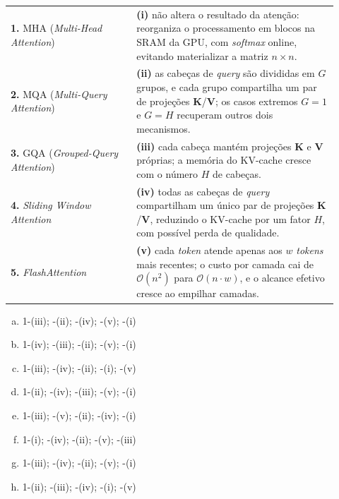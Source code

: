 \documentclass{dlproblemset}
\begin{document}
\begin{enumerate}[I)]
\begin{center}
\begin{tabular}{p{0.35\linewidth} p{0.57\linewidth}}
\textbf{1.} MHA (\textit{Multi-Head Attention}) & \textbf{(i)} não altera o resultado da atenção: reorganiza o processamento em blocos na SRAM da GPU, com \textit{softmax} online, evitando materializar a matriz $n \times n$. \\
\textbf{2.} MQA (\textit{Multi-Query Attention}) & \textbf{(ii)} as cabeças de \textit{query} são divididas em $G$ grupos, e cada grupo compartilha um par de projeções $\mathbf{K}$/$\mathbf{V}$; os casos extremos $G = 1$ e $G = H$ recuperam outros dois mecanismos. \\
\textbf{3.} GQA (\textit{Grouped-Query Attention}) & \textbf{(iii)} cada cabeça mantém projeções $\mathbf{K}$ e $\mathbf{V}$ próprias; a memória do KV-cache cresce com o número $H$ de cabeças. \\
\textbf{4.} \textit{Sliding Window Attention} & \textbf{(iv)} todas as cabeças de \textit{query} compartilham um único par de projeções $\mathbf{K}$/$\mathbf{V}$, reduzindo o KV-cache por um fator $H$, com possível perda de qualidade. \\
\textbf{5.} \textit{FlashAttention} & \textbf{(v)} cada \textit{token} atende apenas aos $w$ \textit{tokens} mais recentes; o custo por camada cai de $\mathcal{O}(n^2)$ para $\mathcal{O}(n \cdot w)$, e o alcance efetivo cresce ao empilhar camadas. \\
\end{tabular}
\end{center}

\begin{enumerate}[a)]
    \item 1-(iii); -(ii); -(iv); -(v); -(i)
    \item 1-(iv); -(iii); -(ii); -(v); -(i)
    \item 1-(iii); -(iv); -(ii); -(i); -(v)
    \item 1-(ii); -(iv); -(iii); -(v); -(i)
    \item 1-(iii); -(v); -(ii); -(iv); -(i)
    \item 1-(i); -(iv); -(ii); -(v); -(iii)
    \item 1-(iii); -(iv); -(ii); -(v); -(i)
    \item 1-(ii); -(iii); -(iv); -(i); -(v)
\end{enumerate}


\end{enumerate}
\end{document}
